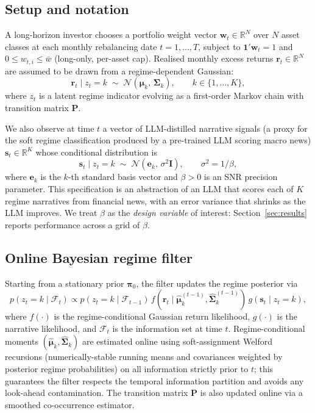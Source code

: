 \documentclass[review,12pt,authoryear]{elsarticle}
\begin{document}
\subsection{Setup and notation}
A long-horizon investor chooses a portfolio weight vector $\mathbf{w}_t \in \mathbb{R}^N$ over
$N$ asset classes at each monthly rebalancing date $t=1,\ldots,T$, subject to
$\mathbf{1}'\mathbf{w}_t = 1$ and $0 \le w_{t,i} \le \bar{w}$ (long-only, per-asset cap).
Realised monthly excess returns $\mathbf{r}_t \in \mathbb{R}^N$ are assumed to be drawn from a
regime-dependent Gaussian:
\[
\mathbf{r}_t \mid z_t = k \;\sim\; \mathcal{N}(\boldsymbol{\mu}_k,\,\boldsymbol{\Sigma}_k),
\qquad k \in \{1,\ldots,K\},
\]
where $z_t$ is a latent regime indicator evolving as a first-order Markov chain with
transition matrix $\mathbf{P}$.

We also observe at time $t$ a vector of LLM-distilled narrative signals (a proxy for
the soft regime classification produced by a pre-trained LLM scoring macro news)
$\mathbf{s}_t \in \mathbb{R}^K$ whose conditional distribution is
\[
\mathbf{s}_t \mid z_t = k \;\sim\; \mathcal{N}(\mathbf{e}_k,\,\sigma^2 \mathbf{I}),
\qquad \sigma^2 = 1/\beta,
\]
where $\mathbf{e}_k$ is the $k$-th standard basis vector and $\beta>0$ is an SNR
precision parameter. This specification is an abstraction of an LLM that scores each of
$K$ regime narratives from financial news, with an error variance that shrinks as the LLM
improves. We treat $\beta$ as the \emph{design variable} of interest: Section~\ref{sec:results}
reports performance across a grid of $\beta$.

\subsection{Online Bayesian regime filter}
Starting from a stationary prior $\boldsymbol{\pi}_0$, the filter updates the regime
posterior via
\begin{equation}
p(z_t=k \mid \mathcal{F}_{t}) \propto p(z_t=k \mid \mathcal{F}_{t-1})\,
f(\mathbf{r}_t \mid \hat{\boldsymbol{\mu}}_k^{(t-1)},\hat{\boldsymbol{\Sigma}}_k^{(t-1)})\,
g(\mathbf{s}_t \mid z_t=k),
\label{eq:filter}
\end{equation}
where $f(\cdot)$ is the regime-conditional Gaussian return likelihood, $g(\cdot)$ is the
narrative likelihood, and $\mathcal{F}_t$ is the information set at time $t$.
Regime-conditional moments $(\hat{\boldsymbol{\mu}}_k,\hat{\boldsymbol{\Sigma}}_k)$ are
estimated online using soft-assignment Welford recursions (numerically-stable running
means and covariances weighted by posterior regime probabilities) on all information
strictly prior to $t$; this guarantees the filter respects the temporal information partition and
avoids any look-ahead contamination. The transition matrix $\mathbf{P}$ is also updated
online via a smoothed co-occurrence estimator.
\end{document}
